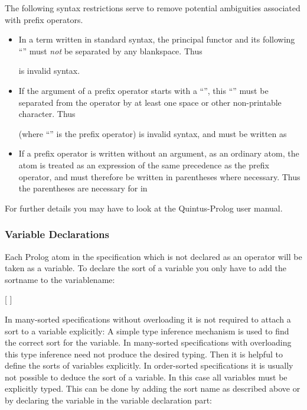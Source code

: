 {\noindent
The following syntax restrictions serve to remove potential ambiguities associated with
prefix operators.
\begin{itemize}
\item
In a term written in standard syntax, the principal functor and its following 
``\kw{(}'' must {\em not} be separated by any blankspace. Thus
\begin{quotation}
 \medskip
\end{quotation}
is invalid syntax.
\item
If the argument of a prefix operator starts with a ``\cec{(}'', this ``\cec{(}'' 
must be separated from the operator by at least one space or other
non-printable character. Thus 
\begin{quotation}
\medskip
\end{quotation}
(where ``\cec{:-}'' is the prefix operator) is invalid syntax, and must be written as
\begin{quotation}
\medskip
\end{quotation}
\item
If a prefix operator is written without an argument, as an ordinary atom, the atom is
treated as an expression of the same precedence as the prefix operator, and must
therefore be written in parentheses where necessary. 
Thus the parentheses are necessary for \cec{-} in 
\begin{quotation}
\end{quotation}
\end{itemize}
For further details you may have to
look at the Quintus-Prolog user manual. 

\subsubsection{Variable Declarations}
\label{vardecl}

Each Prolog atom in the specification which is not declared as an 
operator will be taken as a variable. To declare the sort of
a variable you only have to add the sortname to the variablename:

\begin{syntax}
 \IS {} [ \kw{:}  ]
\end{syntax}

In many-sorted specifications without overloading it is not required to
attach a sort to a variable explicitly: A simple type inference mechanism is
used to find the correct sort for the variable. In many-sorted specifications
with overloading this type inference need not produce the desired typing. 
Then it is helpful to define the sorts of variables explicitly.
In order-sorted specifications it is usually not possible to deduce
the sort of a variable. In this case all variables
must be explicitly typed. This can be done by adding
the sort name as described above or by declaring the variable in the
variable declaration part: 

}
